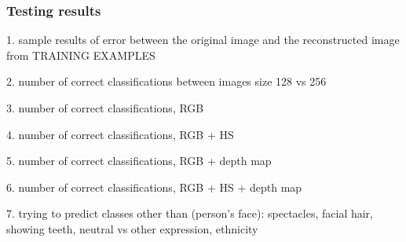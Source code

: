 \subsubsection{Testing results}
\label{sec:pcaresults}

1. sample results of error between the original image and the reconstructed image from TRAINING EXAMPLES

2. number of correct classifications between images size 128 vs 256

3. number of correct classifications, RGB

4. number of correct classifications, RGB + HS

5. number of correct classifications, RGB  + depth map

6. number of correct classifications, RGB + HS + depth map

7. trying to predict classes other than (person's face): spectacles, facial hair, showing teeth, neutral vs other expression, ethnicity


